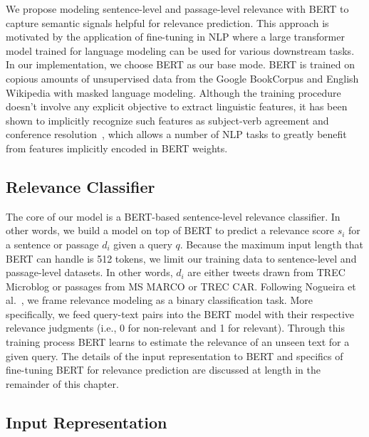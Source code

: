 We propose modeling sentence-level and passage-level relevance with BERT to capture semantic signals helpful for relevance prediction.
This approach is motivated by the application of fine-tuning in NLP where a large transformer model trained for language modeling can be used for various downstream tasks.
In our implementation, we choose BERT as our base mode.
BERT is trained on copious amounts of unsupervised data from the Google BookCorpus and English Wikipedia with masked language modeling.
Although the training procedure doesn't involve any explicit objective to extract linguistic features, it has been shown to implicitly recognize such features as subject-verb agreement and conference resolution~\cite{jawahar2019does, clark2019does}, which allows a number of NLP tasks to greatly benefit from features implicitly encoded in BERT weights.

\subsection{Relevance Classifier}

The core of our model is a BERT-based sentence-level relevance classifier.
In other words, we build a model on top of BERT to predict a relevance score $ s_i $ for a sentence or passage $ d_i $ given a query $ q $.
Because the maximum input length that BERT can handle is 512 tokens, we limit our training data to sentence-level and passage-level datasets.
In other words, $ d_i $ are either tweets drawn from TREC Microblog or passages from MS MARCO or TREC CAR.
Following Nogueira et al.~\cite{nogueira2019passage}, we frame relevance modeling as a binary classification task.
More specifically, we feed query-text pairs into the BERT model with their respective relevance judgments (i.e., 0 for non-relevant and 1 for relevant).
Through this training process BERT learns to estimate the relevance of an unseen text for a given query.
The details of the input representation to BERT and specifics of fine-tuning BERT for relevance prediction are discussed at length in the remainder of this chapter.

\subsection{Input Representation}

